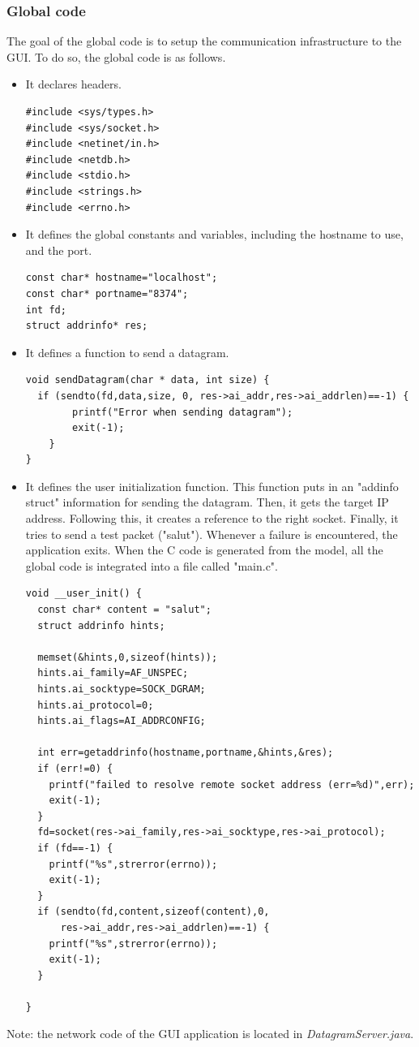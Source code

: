 \documentclass[12pt]{article}
\begin{document}
\subsubsection{Global code}
The goal of the global code is to setup the communication infrastructure to the GUI. To do so, the global code is as follows.
\begin{itemize}
\item It declares headers.
\begin{lstlisting}
#include <sys/types.h>
#include <sys/socket.h>
#include <netinet/in.h>
#include <netdb.h>
#include <stdio.h>
#include <strings.h>
#include <errno.h>
\end{lstlisting}

\item It defines the global constants and variables, including the hostname to use, and the port.
\begin{lstlisting}
const char* hostname="localhost";
const char* portname="8374";
int fd;
struct addrinfo* res;
\end{lstlisting}

\item It defines a function to send a datagram.
\begin{lstlisting}
void sendDatagram(char * data, int size) {
  if (sendto(fd,data,size, 0, res->ai_addr,res->ai_addrlen)==-1) {
        printf("Error when sending datagram");
        exit(-1);
    }
}
\end{lstlisting}
\item It defines the user initialization function. This function puts in an "addinfo struct" information for sending the datagram. Then, it gets the target IP address. Following this, it creates a reference to the right socket. Finally, it tries to send a test packet ("salut"). Whenever a failure is encountered, the application exits. When the C code is generated from the model, all the global code is integrated into a file called "main.c".
\begin{lstlisting}
void __user_init() { 
  const char* content = "salut";
  struct addrinfo hints;

  memset(&hints,0,sizeof(hints));
  hints.ai_family=AF_UNSPEC;
  hints.ai_socktype=SOCK_DGRAM;
  hints.ai_protocol=0;
  hints.ai_flags=AI_ADDRCONFIG;
 
  int err=getaddrinfo(hostname,portname,&hints,&res);
  if (err!=0) {
    printf("failed to resolve remote socket address (err=%d)",err);
    exit(-1);
  }
  fd=socket(res->ai_family,res->ai_socktype,res->ai_protocol);
  if (fd==-1) {
    printf("%s",strerror(errno));
    exit(-1);
  }
  if (sendto(fd,content,sizeof(content),0,
      res->ai_addr,res->ai_addrlen)==-1) {
    printf("%s",strerror(errno));
    exit(-1);
  }

}
\end{lstlisting}
\end{itemize}
Note: the network code of the GUI application is located in \textit{DatagramServer.java}.
\end{document}
